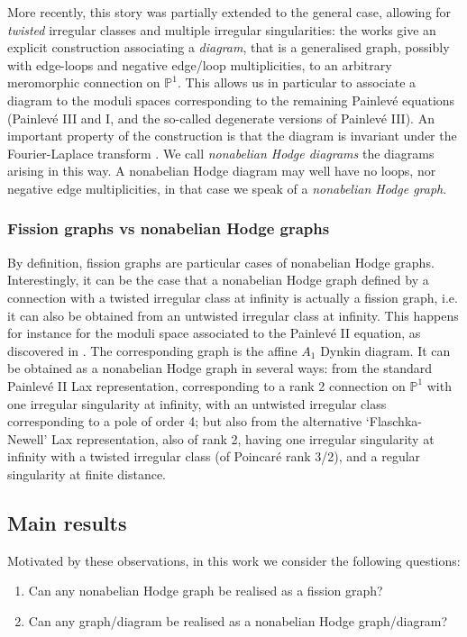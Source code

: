 \documentclass[11pt,a4paper]{amsart}
\numberwithin{equation}{section}
\begin{document}
More recently, this story was partially extended to the general case, allowing for \emph{twisted} irregular classes and multiple irregular singularities:  the works \cite{boalch2020diagrams, doucot2021diagrams} give an explicit construction associating a \emph{diagram}, that is a generalised graph, possibly with edge-loops and negative edge/loop multiplicities, to an arbitrary meromorphic connection on $\mathbb P^1$. This allows us in particular to associate a diagram to the moduli spaces corresponding to the remaining Painlevé equations (Painlevé III and I, and the so-called degenerate versions of Painlevé III). An important property of the construction is that the diagram is invariant under the Fourier-Laplace transform \cite{doucot2021diagrams}. We call \emph{nonabelian Hodge diagrams} the diagrams arising in this way. A nonabelian Hodge diagram may well have no loops, nor negative edge multiplicities, in that case we speak of a \emph{nonabelian Hodge graph}.


\subsubsection*{Fission graphs vs nonabelian Hodge graphs}
By definition, fission graphs are particular cases of nonabelian Hodge graphs. Interestingly, it can be the case that a nonabelian Hodge graph defined by a connection with a twisted irregular class at infinity is actually a fission graph, i.e. it can also be obtained from an untwisted irregular class at infinity. This happens for instance for the moduli space associated to the Painlevé II equation, as discovered in \cite{boalch2020diagrams}. The corresponding graph is the affine $A_1$ Dynkin diagram. It can be obtained as a nonabelian Hodge graph in several ways: from the standard Painlevé II Lax representation, corresponding to a rank 2 connection on $\mathbb P^1$ with one irregular singularity at infinity, with an untwisted irregular class corresponding to a pole of order 4; but also from the alternative `Flaschka-Newell' Lax representation, also of rank 2, having one irregular singularity at infinity with a twisted irregular class (of Poincaré rank 3/2), and a regular singularity at finite distance.

\subsection{Main results}

Motivated by these observations, in this work we consider the following questions:
\begin{enumerate}
\item   Can any nonabelian Hodge graph be realised as a fission graph?
\item Can any graph/diagram be realised as a nonabelian Hodge graph/diagram? 
\end{enumerate}
\end{document}
